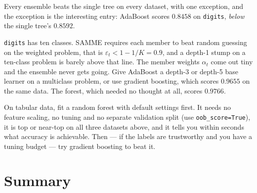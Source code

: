 \documentclass[11pt]{article}
\begin{document}
Every ensemble beats the single tree on every dataset, with one exception, and
the exception is the interesting entry: AdaBoost scores $0.8458$ on
\texttt{digits}, \emph{below} the single tree's $0.8592$.

\begin{caution}
\texttt{digits} has ten classes. SAMME requires each member to beat random
guessing on the weighted problem, that is $\varepsilon_t < 1 - 1/K = 0.9$, and
a depth-1 stump on a ten-class problem is barely above that line. The member
weights $\alpha_t$ come out tiny and the ensemble never gets going. Give
AdaBoost a depth-3 or depth-5 base learner on a multiclass problem, or use
gradient boosting, which scores $0.9655$ on the same data. The forest, which
needed no thought at all, scores $0.9766$.
\end{caution}

\begin{keyidea}
On tabular data, fit a random forest with default settings first. It needs no
feature scaling, no tuning and no separate validation split (use
\texttt{oob\_score=True}), it is top or near-top on all three datasets above,
and it tells you within seconds what accuracy is achievable. Then --- if the
labels are trustworthy and you have a tuning budget --- try gradient boosting to
beat it.
\end{keyidea}

\notesources{\AMLUnitVISources}

\section{Summary}
\label{sec:summary}
\end{document}
